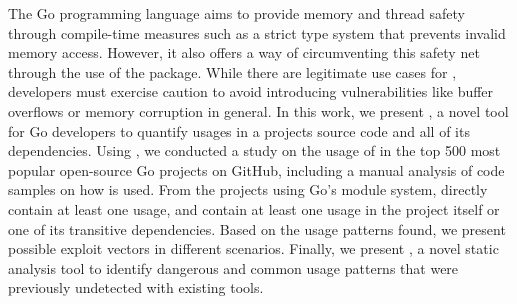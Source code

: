 The Go programming language aims to provide memory and thread safety through compile-time measures such as a strict type system that prevents invalid memory access. 
However, it also offers a way of circumventing this safety net through the use of the \unsafe{} package.
While there are legitimate use cases for \unsafe{}, developers must exercise caution to avoid introducing vulnerabilities like buffer overflows or memory corruption in general.
In this work, we present \toolUsage{}, a novel tool for Go developers to quantify \unsafe{} usages in a projects source code and all of its dependencies.
Using \toolUsage{}, we conducted a study on the usage of \unsafe{} in the top 500 most popular open-source Go projects on GitHub, including a manual analysis of \numberCodeSnippets{} code samples on how \unsafe{} is used.
From the projects using Go's module system, %
\percentageProjectsWithUnsafe{} %
directly contain at least one \unsafe{} usage,
and \percentageProjectsAndDependenciesUnsafe{} contain at least one \unsafe{} usage in the project itself or one of its transitive dependencies.
Based on the usage patterns found, we present possible exploit vectors in different scenarios. 
Finally, we present \toolSA{}, a novel static analysis tool to identify dangerous and common usage patterns that were previously undetected with existing tools.
